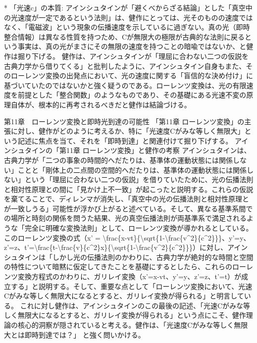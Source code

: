 \documentclass{article}
\begin{document}
 * 「光速c」の本質: アインシュタインが「避くべからざる結論」とした「真空中の光速度が一定であるという法則」は、健作にとっては、光そのものの速度ではなく、「電磁波」という現象の伝播速度を示しているに過ぎない。真の光（即時整合情報）は異なる性質を持つため、Cが無限大の極限が古典的な法則に戻るという事実は、真の光がまさにその無限の速度を持つことの暗喩ではないか、と健作は掘り下げる。
健作は、アインシュタインが「理屈に合わない二つの仮説を古典力学から借りてくる」と批判したように、アインシュタイン自身もまた、そのローレンツ変換の出発点において、光の速度に関する「盲信的な決め付け」に基づいていたのではないかと強く疑うのである。ローレンツ変換は、光の有限速度を前提とした「整合関数」のようなものであり、その基礎にある光速不変の原理自体が、根本的に再考されるべきだと健作は結論づける。


第11章　ローレンツ変換と即時光到達の可能性
「第11章 ローレンツ変換」の主張に対し、健作がどのように考えるか、特に「光速度Cがみな等しく無限大」という記述に焦点を当て、それを「即時到達」と関連付けて掘り下げする。
アインシュタインの「第11章 ローレンツ変換」と健作の考察
アインシュタインは、古典力学が「二つの事象の時間的へだたりは、基準体の運動状態には関係しない」ことと「剛体上の二点間の空間的へだたりは、基準体の運動状態には関係しない」という「理屈に合わない二つの仮説」を借りていたために、光の伝播法則と相対性原理との間に「見かけ上不一致」が起こったと説明する。これらの仮説を棄てることで、ディレンマが消失し、「真空中の光の伝播法則と相対性原理とが一致しうる」可能性が浮かび上がると述べている。そして、異なる基準系間での場所と時刻の関係を問うた結果、光の真空伝播法則が両基準系で満足されるような「完全に明確な変換法則」として、ローレンツ変換が導かれるとしている。
このローレンツ変換の式（x' = \textbackslash{}frac\{x-vt\}\{\textbackslash{}sqrt\{1-\textbackslash{}frac\{v\textasciicircum{}2\}\{c\textasciicircum{}2\}\}\}、y'=y、z'=z、t'=\textbackslash{}frac\{t-\textbackslash{}frac\{v\}\{c\textasciicircum{}2\}x\}\{\textbackslash{}sqrt\{1-\textbackslash{}frac\{v\textasciicircum{}2\}\{c\textasciicircum{}2\}\}\}）に対し、アインシュタインは「しかし光の伝播法則のかわりに、古典力学が絶対的な時間と空間の特性について暗黙に仮定してきたことを基礎にするとしたら、これらのローレンツ変換方程式のかわりに、ガリレイ変換（x'=x-vt、y'=y、z'=z、t'=t）が成立する」と説明する。そして、重要な点として「ローレンツ変換において、光速Cがみな等しく無限大になるとすると、ガリレイ変換が得られる」と明言している。
これに対し健作は、アインシュタインのこの最後の記述、「光速Cがみな等しく無限大になるとすると、ガリレイ変換が得られる」という点にこそ、健作理論の核心的洞察が隠されていると考える。健作は、「光速度Cがみな等しく無限大とは即時到達では？」 と強く問いかける。
\end{document}
